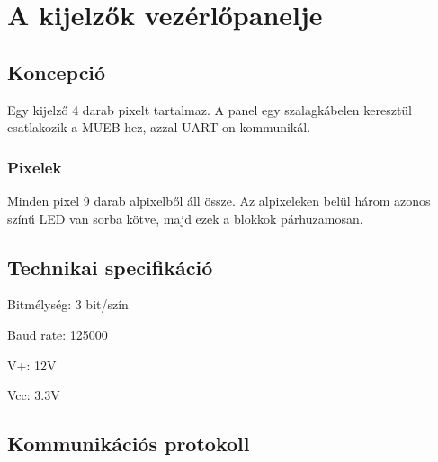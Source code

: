 \chapter{A kijelzők vezérlőpanelje}

\section{Koncepció}
Egy kijelző 4 darab pixelt tartalmaz. A panel egy szalagkábelen keresztül csatlakozik a MUEB-hez, azzal UART-on kommunikál.

\subsection{Pixelek}
Minden pixel 9 darab alpixelből áll össze. Az alpixeleken belül három azonos színű LED van sorba kötve, majd ezek a blokkok párhuzamosan.

\section{Technikai specifikáció} %
\par
Bitmélység: 3 bit/szín
\par
Baud rate: 125000
\par
V+: 12V
\par
Vcc: 3.3V

\section{Kommunikációs protokoll}

